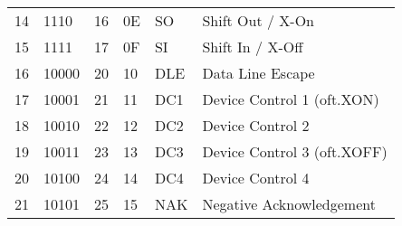 \begin{center}
\begin{longtable}{llllll}
\rowcolor[HTML]{F3F6F6} 
{\color[HTML]{404040} 14}               & {\color[HTML]{404040} 1110}            & {\color[HTML]{404040} 16}             & {\color[HTML]{404040} 0E}                   & {\color[HTML]{404040} SO}                 & {\color[HTML]{404040} Shift Out / X-On}                      \\
\rowcolor[HTML]{FCFCFC} 
{\color[HTML]{404040} 15}               & {\color[HTML]{404040} 1111}            & {\color[HTML]{404040} 17}             & {\color[HTML]{404040} 0F}                   & {\color[HTML]{404040} SI}                 & {\color[HTML]{404040} Shift In / X-Off}                      \\
\rowcolor[HTML]{F3F6F6} 
{\color[HTML]{404040} 16}               & {\color[HTML]{404040} 10000}           & {\color[HTML]{404040} 20}             & {\color[HTML]{404040} 10}                   & {\color[HTML]{404040} DLE}                & {\color[HTML]{404040} Data Line Escape}                      \\
\rowcolor[HTML]{FCFCFC} 
{\color[HTML]{404040} 17}               & {\color[HTML]{404040} 10001}           & {\color[HTML]{404040} 21}             & {\color[HTML]{404040} 11}                   & {\color[HTML]{404040} DC1}                & {\color[HTML]{404040} Device Control 1 (oft.XON)}            \\
\rowcolor[HTML]{F3F6F6} 
{\color[HTML]{404040} 18}               & {\color[HTML]{404040} 10010}           & {\color[HTML]{404040} 22}             & {\color[HTML]{404040} 12}                   & {\color[HTML]{404040} DC2}                & {\color[HTML]{404040} Device Control 2}                      \\
\rowcolor[HTML]{FCFCFC} 
{\color[HTML]{404040} 19}               & {\color[HTML]{404040} 10011}           & {\color[HTML]{404040} 23}             & {\color[HTML]{404040} 13}                   & {\color[HTML]{404040} DC3}                & {\color[HTML]{404040} Device Control 3 (oft.XOFF)}           \\
\rowcolor[HTML]{F3F6F6} 
{\color[HTML]{404040} 20}               & {\color[HTML]{404040} 10100}           & {\color[HTML]{404040} 24}             & {\color[HTML]{404040} 14}                   & {\color[HTML]{404040} DC4}                & {\color[HTML]{404040} Device Control 4}                      \\
\rowcolor[HTML]{FCFCFC} 
{\color[HTML]{404040} 21}               & {\color[HTML]{404040} 10101}           & {\color[HTML]{404040} 25}             & {\color[HTML]{404040} 15}                   & {\color[HTML]{404040} NAK}                & {\color[HTML]{404040} Negative Acknowledgement}              \\

\end{longtable}
\end{center}
